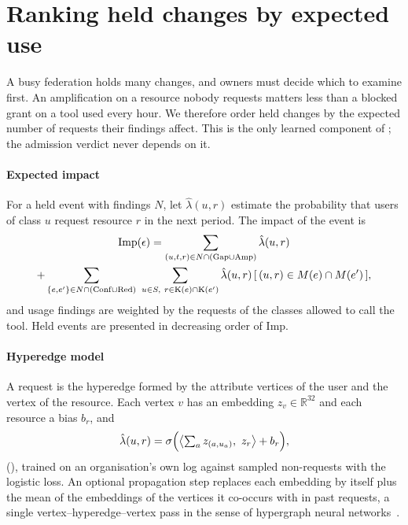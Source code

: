 \section{Ranking held changes by expected use}\label{sec:ranking}

A busy federation holds many changes, and owners must decide which to examine first. An amplification on a resource nobody requests matters less than a blocked grant on a tool used every hour. We therefore order held changes by the expected number of requests their findings affect. This is the only learned component of \name; the admission verdict never depends on it.

\paragraph{Expected impact} For a held event with findings $N$, let $\hat\lambda(u, r)$ estimate the probability that users of class $u$ request resource $r$ in the next period. The impact of the event is
\begin{multline}
\mathrm{Imp}(\epsilon) = \sum_{(u, t, r) \in N \cap (\mathrm{Gap} \cup \mathrm{Amp})} \hat\lambda(u, r)\\
+ \sum_{\{e, e'\} \in N \cap (\mathrm{Conf} \cup \mathrm{Red})} \ \sum_{u \in S,\ r \in \mathrm{K}(e) \cap \mathrm{K}(e')} \hat\lambda(u, r)\, [\,(u, r) \in M(e) \cap M(e')\,], \label{eq:impact}
\end{multline}
and usage findings are weighted by the requests of the classes allowed to call the tool. Held events are presented in decreasing order of $\mathrm{Imp}$.

\paragraph{Hyperedge model} A request is the hyperedge formed by the attribute vertices of the user and the vertex of the resource. Each vertex $v$ has an embedding $z_v \in \mathbb{R}^{32}$ and each resource a bias $b_r$, and
\begin{equation}
\hat\lambda(u, r) = \sigma\Bigl(\bigl\langle \textstyle\sum_{a} z_{(a, u_a)},\ z_r \bigr\rangle + b_r\Bigr), \label{eq:scorer}
\end{equation}
(), trained on an organisation's own log against sampled non-requests with the logistic loss. An optional propagation step replaces each embedding by itself plus the mean of the embeddings of the vertices it co-occurs with in past requests, a single vertex--hyperedge--vertex pass in the sense of hypergraph neural networks~\cite{feng2019hgnn}.


